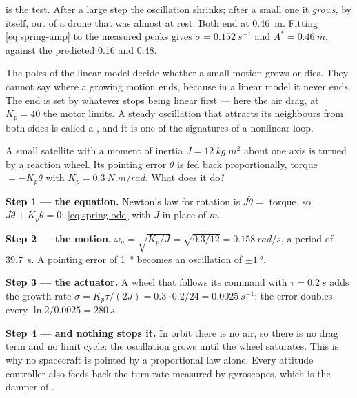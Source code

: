 
 is the test. After a large step the oscillation shrinks; after a small one it \emph{grows}, by itself, out of a drone that was almost at rest. Both end at \SI{0.46}{m}. Fitting \cref{eq:spring-amp} to the measured peaks gives $\sigma = \SI{0.152}{s^{-1}}$ and $A^* = \SI{0.46}{m}$, against the predicted 0.16 and 0.48.

\begin{keyidea}
The poles of the linear model decide whether a small motion grows or dies. They cannot say where a growing motion ends, because in a linear model it never ends. The end is set by whatever stops being linear first — here the air drag, at $K_p = 40$ the motor limits. A steady oscillation that attracts its neighbours from both sides is called a , and it is one of the signatures of a nonlinear loop.
\end{keyidea}

\begin{example}
\label{ex:spring-sat}
A small satellite with a moment of inertia $J = \SI{12}{kg.m^2}$ about one axis is turned by a reaction wheel. Its pointing error $\theta$ is fed back proportionally, torque $= -K_p\theta$ with $K_p = \SI{0.3}{N.m/rad}$. What does it do?

\textbf{Step 1 — the equation.} Newton's law for rotation is $J\ddot\theta = $ torque, so $J\ddot\theta + K_p\theta = 0$: \cref{eq:spring-ode} with $J$ in place of $m$.

\textbf{Step 2 — the motion.} $\omega_n = \sqrt{K_p/J} = \sqrt{0.3/12} = \SI{0.158}{rad/s}$, a period of \SI{39.7}{s}. A pointing error of \SI{1}{\degree} becomes an oscillation of $\pm\SI{1}{\degree}$.

\textbf{Step 3 — the actuator.} A wheel that follows its command with $\tau = \SI{0.2}{s}$ adds the growth rate $\sigma = K_p\tau/(2J) = 0.3\cdot0.2/24 = \SI{0.0025}{s^{-1}}$: the error doubles every $\ln2/0.0025 = \SI{280}{s}$.

\textbf{Step 4 — and nothing stops it.} In orbit there is no air, so there is no drag term and no limit cycle: the oscillation grows until the wheel saturates. This is why no spacecraft is pointed by a proportional law alone. Every attitude controller also feeds back the turn rate measured by gyroscopes, which is the damper of .
\end{example}

